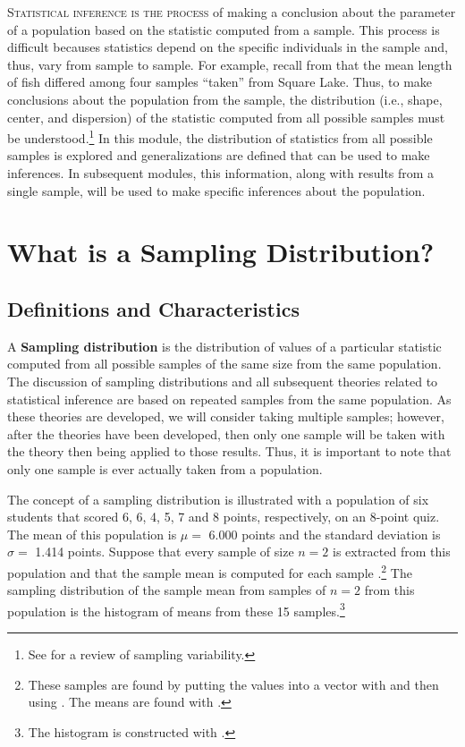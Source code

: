 \documentclass[10pt,openany]{book}\usepackage[]{graphicx}\usepackage[]{color}
\begin{document}
\lettrine{S}{tatistical inference is the process} of making a conclusion about the parameter of a population based on the statistic computed from a sample. This process is difficult becauses statistics depend on the specific individuals in the sample and, thus, vary from sample to sample. For example, recall from  that the mean length of fish differed among four samples ``taken'' from Square Lake. Thus, to make conclusions about the population from the sample, the distribution (i.e., shape, center, and dispersion) of the statistic computed from all possible samples must be understood.\footnote{See  for a review of sampling variability.} In this module, the distribution of statistics from all possible samples is explored and generalizations are defined that can be used to make inferences. In subsequent modules, this information, along with results from a single sample, will be used to make specific inferences about the population.



\section{What is a Sampling Distribution?}
\subsection{Definitions and Characteristics}  \label{sec:SDistDefn}
A \textbf{Sampling distribution} is the distribution of values of a particular statistic computed from all possible samples of the same size from the same population. The discussion of sampling distributions and all subsequent theories related to statistical inference are based on repeated samples from the same population. As these theories are developed, we will consider taking multiple samples; however, after the theories have been developed, then only one sample will be taken with the theory then being applied to those results. Thus, it is important to note that only one sample is ever actually taken from a population.



The concept of a sampling distribution is illustrated with a population of six students that scored 6, 6, 4, 5, 7 and 8 points, respectively, on an 8-point quiz. The mean of this population is $\mu=$ 6.000 points and the standard deviation is $\sigma=$ 1.414 points. Suppose that every sample of size $n=2$ is extracted from this population and that the sample mean is computed for each sample .\footnote{These samples are found by putting the values into a vector with  and then using . The means are found with .} The sampling distribution of the sample mean from samples of $n=2$ from this population  is the histogram of means from these 15 samples.\footnote{The histogram is constructed with .}
\end{document}
